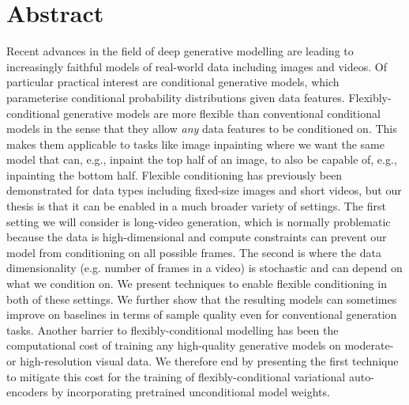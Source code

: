 
\chapter{Abstract}

Recent advances in the field of deep generative modelling are leading to increasingly faithful models of real-world data including images and videos. Of particular practical interest are conditional generative models, which parameterise conditional probability distributions given data features. Flexibly-conditional generative models are more flexible than conventional conditional models in the sense that they allow \textit{any} data features to be conditioned on. This makes them applicable to tasks like image inpainting where we want the same model that can, e.g., inpaint the top half of an image, to also be capable of, e.g., inpainting the bottom half. Flexible conditioning has previously been demonstrated for data types including fixed-size images and short videos, but our thesis is that it can be enabled in a much broader variety of settings. The first setting we will consider is long-video generation, which is normally problematic because the data is high-dimensional and compute constraints can prevent our model from conditioning on all possible frames. The second is where the data dimensionality (e.g. number of frames in a video) is stochastic and can depend on what we condition on. We present techniques to enable flexible conditioning in both of these settings. We further show that the resulting models can sometimes improve on baselines in terms of sample quality even for conventional generation tasks. Another barrier to flexibly-conditional modelling has been the computational cost of training any high-quality generative models on moderate- or high-resolution visual data. We therefore end by presenting the first technique to mitigate this cost for the training of flexibly-conditional variational auto-encoders by incorporating pretrained unconditional model weights.




